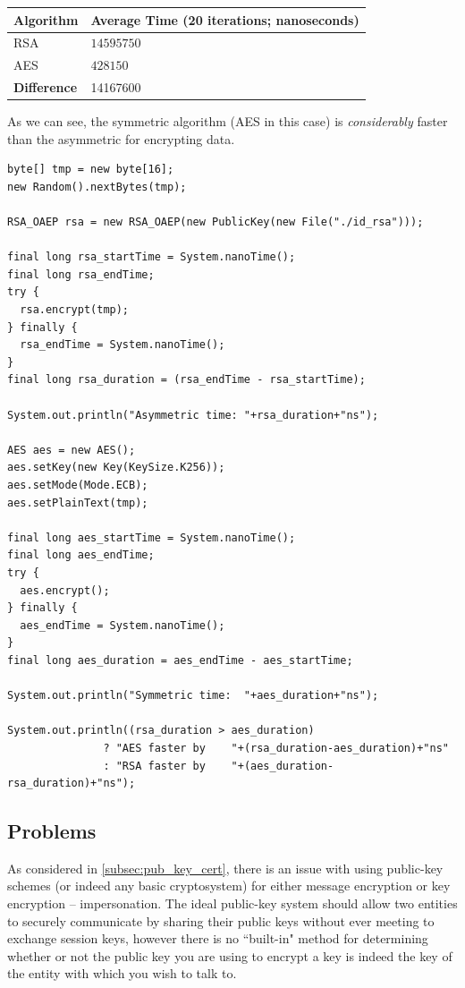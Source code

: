 \begin{center}
    \begin{tabular}{ | l | l |}
    \hline
    	Algorithm & Average Time (20 iterations; nanoseconds) \\ \hline \hline
    	RSA & $14595750$ \\ \hline
    	AES & $428150$ \\ \hline \hline
    	\textbf{Difference} & 14167600  \\
    \hline
    \end{tabular}
\end{center}

As we can see, the symmetric algorithm (AES in this case) is \emph{considerably} faster than the asymmetric for encrypting data. \\

\begin{lstlisting}
byte[] tmp = new byte[16];
new Random().nextBytes(tmp);

RSA_OAEP rsa = new RSA_OAEP(new PublicKey(new File("./id_rsa")));

final long rsa_startTime = System.nanoTime();
final long rsa_endTime;
try {
  rsa.encrypt(tmp);
} finally {
  rsa_endTime = System.nanoTime();
}
final long rsa_duration = (rsa_endTime - rsa_startTime);

System.out.println("Asymmetric time: "+rsa_duration+"ns");

AES aes = new AES();
aes.setKey(new Key(KeySize.K256));
aes.setMode(Mode.ECB);
aes.setPlainText(tmp);

final long aes_startTime = System.nanoTime();
final long aes_endTime;
try {
  aes.encrypt();
} finally {
  aes_endTime = System.nanoTime();
}
final long aes_duration = aes_endTime - aes_startTime;

System.out.println("Symmetric time:  "+aes_duration+"ns");

System.out.println((rsa_duration > aes_duration)
               ? "AES faster by    "+(rsa_duration-aes_duration)+"ns"
               : "RSA faster by    "+(aes_duration-rsa_duration)+"ns");
\end{lstlisting}

\subsection{Problems}

As considered in \textsection\ref{subsec:pub_key_cert}, there is an issue with using public-key schemes (or indeed any basic cryptosystem) for either message encryption or key encryption -- impersonation. The ideal public-key system should allow two entities to securely communicate by sharing their public keys without ever meeting to exchange session keys, however there is no ``built-in" method for determining whether or not the public key you are using to encrypt a key is indeed the key of the entity with which you wish to talk to. 


